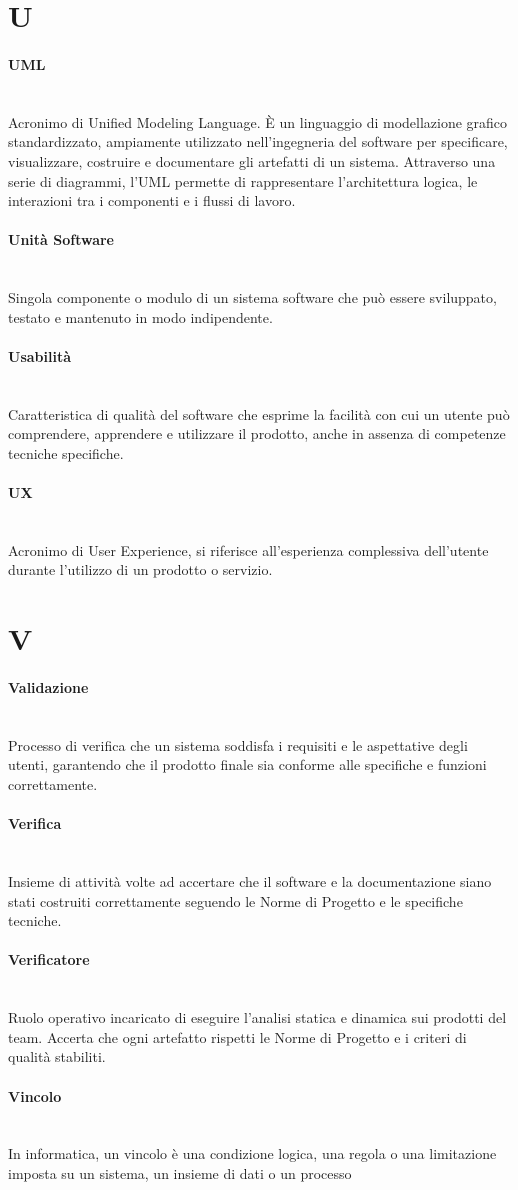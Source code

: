 \documentclass[a4paper, 10pt, colorlinks=true, linkcolor=black, urlcolor=blue, citecolor=blue, hidelinks]{article}
\newcommand{\glossaryterm}[2]{
    \paragraph{#1 \label{term:#1}} \mbox{} \\
    #2
    \vspace{0.5em}
}
\begin{document}
\newpage

\section*{U}

\glossaryterm{UML}{Acronimo di Unified Modeling Language. È un linguaggio di modellazione grafico standardizzato, ampiamente utilizzato nell'ingegneria del software per specificare, visualizzare, costruire e documentare gli artefatti di un sistema. Attraverso una serie di diagrammi, l'UML permette di rappresentare l'architettura logica, le interazioni tra i componenti e i flussi di lavoro.}

\glossaryterm{Unità Software}{Singola componente o modulo di un sistema software che può essere sviluppato, testato e mantenuto in modo indipendente.}

\glossaryterm{Usabilità}{Caratteristica di qualità del software che esprime la facilità con cui un utente può comprendere, apprendere e utilizzare il prodotto, anche in assenza di competenze tecniche specifiche.}

\glossaryterm{UX}{Acronimo di User Experience, si riferisce all'esperienza complessiva dell'utente durante l'utilizzo di un prodotto o servizio.}

\newpage

\section*{V}

\glossaryterm{Validazione}{Processo di verifica che un sistema soddisfa i requisiti e le aspettative degli utenti, garantendo che il prodotto finale sia conforme alle specifiche e funzioni correttamente.}

\glossaryterm{Verifica}{Insieme di attività volte ad accertare che il software e la documentazione siano stati costruiti correttamente seguendo le Norme di Progetto e le specifiche tecniche.}

\glossaryterm{Verificatore}{Ruolo operativo incaricato di eseguire l'analisi statica e dinamica sui prodotti del team. Accerta che ogni artefatto rispetti le Norme di Progetto e i criteri di qualità stabiliti.}

\glossaryterm{Vincolo}{In informatica, un vincolo è una condizione logica, una regola o una limitazione imposta su un sistema, un insieme di dati o un processo}
\end{document}
